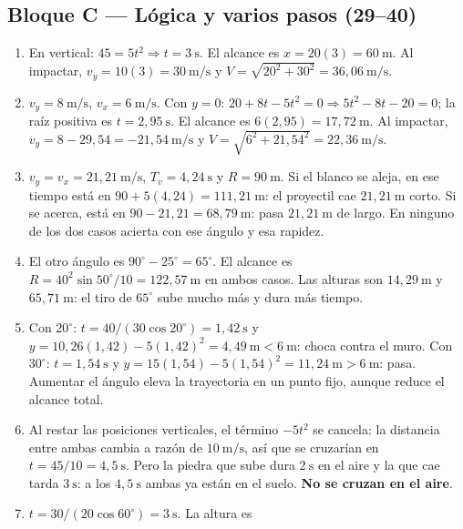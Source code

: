 \documentclass[12pt, letterpaper]{article}
\providecommand{\sen}{\sin}
\begin{document}
\subsection*{Bloque C — Lógica y varios pasos (29--40)}
\begin{enumerate}[leftmargin=*, label=\textbf{\arabic*.}, start=29]
  \item En vertical: $45=5t^2\Rightarrow t=3\ \text{s}$. El alcance es
        $x=20(3)=60\ \text{m}$. Al impactar, $v_y=10(3)=30\ \text{m/s}$ y
        $V=\sqrt{20^2+30^2}=36{,}06\ \text{m/s}$.
  \item $v_y=8\ \text{m/s}$, $v_x=6\ \text{m/s}$. Con $y=0$:
        $20+8t-5t^2=0\Rightarrow5t^2-8t-20=0$; la raíz positiva es
        $t=2{,}95\ \text{s}$. El alcance es $6(2{,}95)=17{,}72\ \text{m}$.
        Al impactar, $v_y=8-29{,}54=-21{,}54\ \text{m/s}$ y
        $V=\sqrt{6^2+21{,}54^2}=22{,}36\ \text{m/s}$.
  \item $v_y=v_x=21{,}21\ \text{m/s}$, $T_v=4{,}24\ \text{s}$ y
        $R=90\ \text{m}$. Si el blanco se aleja, en ese tiempo está en
        $90+5(4{,}24)=111{,}21\ \text{m}$: el proyectil cae
        $21{,}21\ \text{m}$ corto. Si se acerca, está en
        $90-21{,}21=68{,}79\ \text{m}$: pasa $21{,}21\ \text{m}$ de largo.
        En ninguno de los dos casos acierta con ese ángulo y esa rapidez.
  \item El otro ángulo es $90^\circ-25^\circ=65^\circ$. El alcance es
        $R=40^2\sen50^\circ/10=122{,}57\ \text{m}$ en ambos casos. Las
        alturas son $14{,}29\ \text{m}$ y $65{,}71\ \text{m}$: el tiro de
        $65^\circ$ sube mucho más y dura más tiempo.
  \item Con $20^\circ$: $t=40/(30\cos20^\circ)=1{,}42\ \text{s}$ y
        $y=10{,}26(1{,}42)-5(1{,}42)^2=4{,}49\ \text{m}<6\ \text{m}$:
        choca contra el muro. Con $30^\circ$: $t=1{,}54\ \text{s}$ y
        $y=15(1{,}54)-5(1{,}54)^2=11{,}24\ \text{m}>6\ \text{m}$: pasa.
        Aumentar el ángulo eleva la trayectoria en un punto fijo, aunque
        reduce el alcance total.
  \item Al restar las posiciones verticales, el término $-5t^2$ se cancela:
        la distancia entre ambas cambia a razón de $10\ \text{m/s}$, así que
        se cruzarían en $t=45/10=4{,}5\ \text{s}$. Pero la piedra que sube
        dura $2\ \text{s}$ en el aire y la que cae tarda $3\ \text{s}$:
        a los $4{,}5\ \text{s}$ ambas ya están en el suelo. \textbf{No se
        cruzan en el aire}.
  \item $t=30/(20\cos60^\circ)=3\ \text{s}$. La altura es

\end{enumerate}
\end{document}
